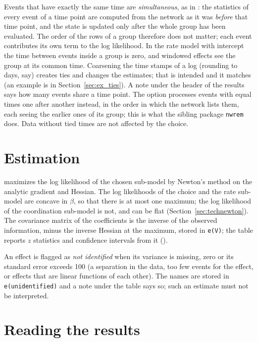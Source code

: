 Events that have exactly the same time are \emph{simultaneous}, as in \goldfish{}: the statistics of every event of a time point are computed from the network as it was \emph{before} that time point, and the state is updated only after the whole group has been evaluated. The order of the rows of a group therefore does not matter; each event contributes its own term to the log likelihood. In the rate model with intercept the time between events inside a group is zero, and windowed effects see the group at its common time. Coarsening the time stamps of a log (rounding to days, say) creates ties and changes the estimates; that is intended and it matches \goldfish{} (an example is in Section~\ref{sec:ex_ties}). A note under the header of the results says how many events share a time point. The option  processes events with equal times one after another instead, in the order in which the network lists them, each seeing the earlier ones of its group; this is what the sibling package \texttt{nwrem} does. Data without tied times are not affected by the choice.

\section{Estimation}\label{sec:estimation}

\nwdynam{} maximizes the log likelihood of the chosen sub-model by Newton's method on the analytic gradient and Hessian. The log likelihoods of the choice and the rate sub-model are concave in $\beta$, so that there is at most one maximum; the log likelihood of the coordination sub-model is not, and can be flat (Section~\ref{sec:technewton}). The covariance matrix of the coefficients is the inverse of the observed information, minus the inverse Hessian at the maximum, stored in \texttt{e(V)}; the table reports $z$ statistics and confidence intervals from it ().

An effect is flagged as \emph{not identified} when its variance is missing, zero or its standard error exceeds 100 (a separation in the data, too few events for the effect, or effects that are linear functions of each other). The names are stored in \texttt{e(unidentified)} and a note under the table says so; such an estimate must not be interpreted.

\section{Reading the results}

